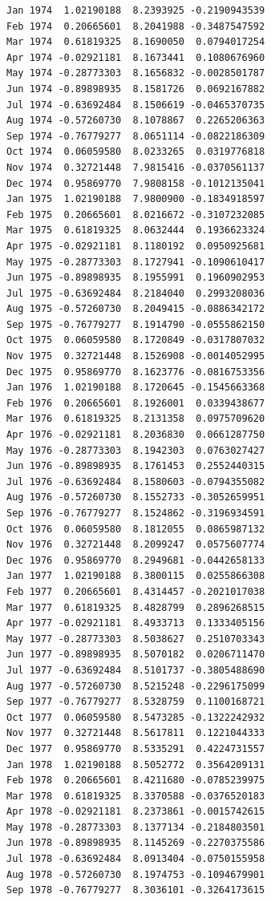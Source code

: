 \documentclass[
  11pt,
  a4paper,
]{report}
\begin{document}
\begin{verbatim}
Jan 1974  1.02190188  8.2393925 -0.2190943539
Feb 1974  0.20665601  8.2041988 -0.3487547592
Mar 1974  0.61819325  8.1690050  0.0794017254
Apr 1974 -0.02921181  8.1673441  0.1080676960
May 1974 -0.28773303  8.1656832 -0.0028501787
Jun 1974 -0.89898935  8.1581726  0.0692167882
Jul 1974 -0.63692484  8.1506619 -0.0465370735
Aug 1974 -0.57260730  8.1078867  0.2265206363
Sep 1974 -0.76779277  8.0651114 -0.0822186309
Oct 1974  0.06059580  8.0233265  0.0319776818
Nov 1974  0.32721448  7.9815416 -0.0370561137
Dec 1974  0.95869770  7.9808158 -0.1012135041
Jan 1975  1.02190188  7.9800900 -0.1834918597
Feb 1975  0.20665601  8.0216672 -0.3107232085
Mar 1975  0.61819325  8.0632444  0.1936623324
Apr 1975 -0.02921181  8.1180192  0.0950925681
May 1975 -0.28773303  8.1727941 -0.1090610417
Jun 1975 -0.89898935  8.1955991  0.1960902953
Jul 1975 -0.63692484  8.2184040  0.2993208036
Aug 1975 -0.57260730  8.2049415 -0.0886342172
Sep 1975 -0.76779277  8.1914790 -0.0555862150
Oct 1975  0.06059580  8.1720849 -0.0317807032
Nov 1975  0.32721448  8.1526908 -0.0014052995
Dec 1975  0.95869770  8.1623776 -0.0816753356
Jan 1976  1.02190188  8.1720645 -0.1545663368
Feb 1976  0.20665601  8.1926001  0.0339438677
Mar 1976  0.61819325  8.2131358  0.0975709620
Apr 1976 -0.02921181  8.2036830  0.0661287750
May 1976 -0.28773303  8.1942303  0.0763027427
Jun 1976 -0.89898935  8.1761453  0.2552440315
Jul 1976 -0.63692484  8.1580603 -0.0794355082
Aug 1976 -0.57260730  8.1552733 -0.3052659951
Sep 1976 -0.76779277  8.1524862 -0.3196934591
Oct 1976  0.06059580  8.1812055  0.0865987132
Nov 1976  0.32721448  8.2099247  0.0575607774
Dec 1976  0.95869770  8.2949681 -0.0442658133
Jan 1977  1.02190188  8.3800115  0.0255866308
Feb 1977  0.20665601  8.4314457 -0.2021017038
Mar 1977  0.61819325  8.4828799  0.2896268515
Apr 1977 -0.02921181  8.4933713  0.1333405156
May 1977 -0.28773303  8.5038627  0.2510703343
Jun 1977 -0.89898935  8.5070182  0.0206711470
Jul 1977 -0.63692484  8.5101737 -0.3805488690
Aug 1977 -0.57260730  8.5215248 -0.2296175099
Sep 1977 -0.76779277  8.5328759  0.1100168721
Oct 1977  0.06059580  8.5473285 -0.1322242932
Nov 1977  0.32721448  8.5617811  0.1221044333
Dec 1977  0.95869770  8.5335291  0.4224731557
Jan 1978  1.02190188  8.5052772  0.3564209131
Feb 1978  0.20665601  8.4211680 -0.0785239975
Mar 1978  0.61819325  8.3370588 -0.0376520183
Apr 1978 -0.02921181  8.2373861 -0.0015742615
May 1978 -0.28773303  8.1377134 -0.2184803501
Jun 1978 -0.89898935  8.1145269 -0.2270375586
Jul 1978 -0.63692484  8.0913404 -0.0750155958
Aug 1978 -0.57260730  8.1974753 -0.1094679901
Sep 1978 -0.76779277  8.3036101 -0.3264173615

\end{verbatim}
\end{document}
